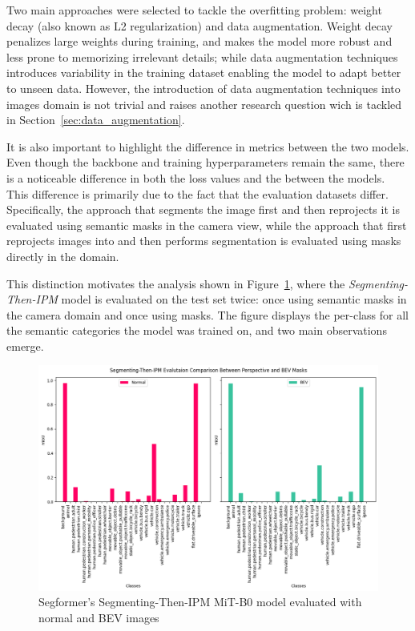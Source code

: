 Two main approaches were selected to tackle the overfitting problem: weight decay (also known as L2 regularization) and data augmentation. Weight decay penalizes large weights during training, and makes the model more robust and less prone to memorizing irrelevant details; while data augmentation techniques introduces variability in the training dataset enabling the model to adapt better to unseen data. However, the introduction of data augmentation techniques into  images domain is not trivial and raises another research question wich is tackled in Section~\ref{sec:data_augmentation}.

It is also important to highlight the difference in metrics between the two models. Even though the backbone and training hyperparameters remain the same, there is a noticeable difference in both the loss values and the  between the models. This difference is primarily due to the fact that the evaluation datasets differ. Specifically, the approach that segments the image first and then reprojects it is evaluated using semantic masks in the camera view, while the approach that first reprojects images into  and then performs segmentation is evaluated using masks directly in the  domain.

This distinction motivates the analysis shown in Figure~\ref{fig:normal_vs_bev_evaluation}, where the \textit{Segmenting-Then-IPM} model is evaluated on the test set twice: once using semantic masks in the camera domain and once using  masks. The figure displays the per-class  for all the semantic categories the model was trained on, and two main observations emerge.

\begin{figure}[!ht]
    \centering
    \includegraphics[width=0.8\linewidth]{./images/experiments/raw2segbev_mit-b0_v0.2_new_test_evaluation.png}
    \caption{Segformer's Segmenting-Then-IPM MiT-B0 model evaluated with normal and BEV images}
    \label{fig:normal_vs_bev_evaluation}
\end{figure}

